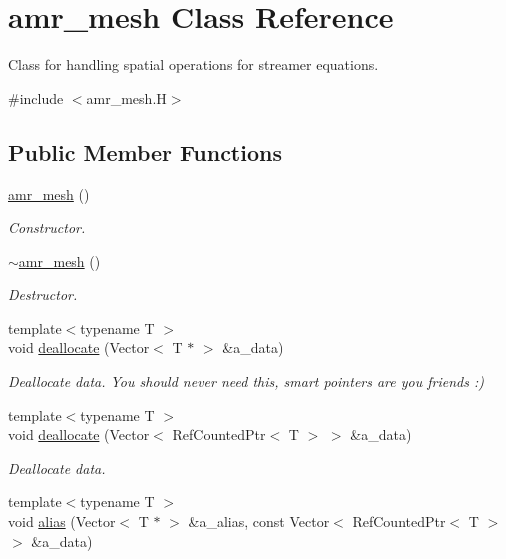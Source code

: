 \hypertarget{classamr__mesh}{}\section{amr\+\_\+mesh Class Reference}
\label{classamr__mesh}


Class for handling spatial operations for streamer equations.  




{\ttfamily \#include $<$amr\+\_\+mesh.\+H$>$}

\subsection*{Public Member Functions}
\begin{DoxyCompactItemize}
\item 
\hyperlink{classamr__mesh_adefb21cc483ce3b9d61370d1643aa807}{amr\+\_\+mesh} ()
\begin{DoxyCompactList}\small\item\em Constructor. \end{DoxyCompactList}\item 
\hyperlink{classamr__mesh_a9bb78ddfd43d6fc1b815ca526f6322d0}{$\sim$amr\+\_\+mesh} ()
\begin{DoxyCompactList}\small\item\em Destructor. \end{DoxyCompactList}\item 
{\footnotesize template$<$typename T $>$ }\\void \hyperlink{classamr__mesh_a870c6a716a9f1b46e2d7a552d0cf77d1}{deallocate} (Vector$<$ T $\ast$ $>$ \&a\+\_\+data)
\begin{DoxyCompactList}\small\item\em Deallocate data. You should never need this, smart pointers are you friends \+:) \end{DoxyCompactList}\item 
{\footnotesize template$<$typename T $>$ }\\void \hyperlink{classamr__mesh_ade1df047db67f520009f2bc59c156f4d}{deallocate} (Vector$<$ Ref\+Counted\+Ptr$<$ T $>$ $>$ \&a\+\_\+data)
\begin{DoxyCompactList}\small\item\em Deallocate data. \end{DoxyCompactList}\item 
{\footnotesize template$<$typename T $>$ }\\void \hyperlink{classamr__mesh_a34f5d07dee8ec93b58cb85f12d471d6c}{alias} (Vector$<$ T $\ast$ $>$ \&a\+\_\+alias, const Vector$<$ Ref\+Counted\+Ptr$<$ T $>$ $>$ \&a\+\_\+data)

\end{DoxyCompactItemize}
